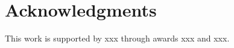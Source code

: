 \section{Acknowledgments}\label{sec:acknowlegments}
This work is supported by xxx through awards xxx and xxx. %

